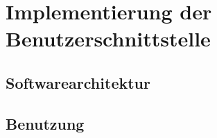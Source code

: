\section{Implementierung der Benutzerschnittstelle}\label{sec:frontend}

\subsection{Softwarearchitektur}

\subsection{Benutzung}